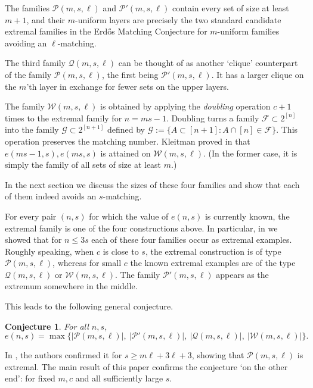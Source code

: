 \documentclass[12pt,a4paper]{article}
\newtheorem{conj}{Conjecture}
\newcommand{\m}{\mathcal}
\begin{document}
The families $\mathcal P(m,s,\ell)$ and $\mathcal P'(m,s,\ell)$ contain every set of size at least $m+1$, and their $m$-uniform layers are precisely the two standard candidate extremal families in the Erd\H{o}s Matching Conjecture for $m$-uniform families avoiding an $\ell$-matching.

The third family $\m Q(m,s,\ell)$ can be thought of as another  `clique' counterpart of the family $\m P(m,s,\ell)$, the first being $\m P'(m,s,\ell)$. It has a larger clique on the $m$'th layer in exchange for fewer sets on the upper layers.

The family $\mathcal W(m,s,\ell)$ is obtained by applying the {\it doubling} operation $c+1$ times to the extremal family for $n=ms-1$. Doubling turns a family $\mathcal F\subset 2^{[n]}$ into the family $\mathcal G\subset 2^{[n+1]}$ defined by
$
\mathcal G:=\{A\subset [n+1]: A\cap [n]\in \mathcal F\}.
$
This operation preserves the matching number. Kleitman proved in \cite{Kl} that $e(ms-1,s), e(ms,s)$ is attained on $\m W(m,s,\ell)$. (In the former case, it is simply the family of all sets of size at least $m$.)

In the next section we discuss the sizes of these four families and show that each of them indeed avoids an $s$-matching.

For every pair $(n,s)$ for which the value of $e(n,s)$ is currently known, the extremal family is one of the four constructions above. In particular, in \cite{KS} we  showed that for $n\le 3s$ each of these four families occur as extremal examples. Roughly speaking, when $c$ is close to $s$, the extremal construction is of type $\mathcal P(m,s,\ell)$, whereas for small $c$ the known extremal examples are of the type $\mathcal Q(m,s,\ell)$ or $\mathcal W(m,s,\ell)$. The family $\m P'(m,s,\ell)$ appears as the extremum somewhere in the middle.

This leads to the following general conjecture.

\begin{conj}
For all $n,s$,
\[
e(n,s)=\max\bigl\{|\mathcal P(m,s,\ell)|,\ |\mathcal P'(m,s,\ell)|,\ |\mathcal Q(m,s,\ell)|,\ |\mathcal W(m,s,\ell)|\bigr\}.
\]
\end{conj}

In \cite{FK9}, the authors confirmed it for $s\ge m\ell+3\ell+3$, showing that $\m P(m,s,\ell)$ is extremal. The main result of this paper confirms the conjecture `on the other end': for fixed $m,c$ and all sufficiently large $s$.
\end{document}
